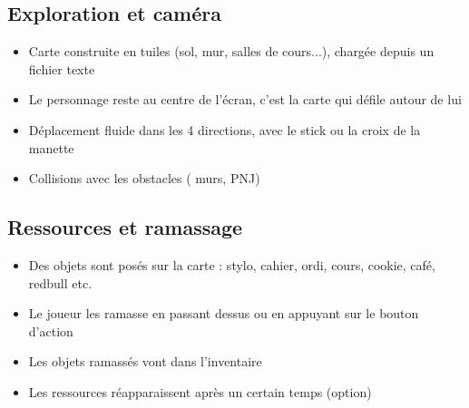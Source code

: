 \documentclass[11pt,a4paper]{article}
\begin{document}
\subsection{Exploration et caméra}
\begin{itemize}
    \item Carte construite en tuiles (sol, mur, salles de cours...), chargée depuis un fichier texte
    \item Le personnage reste au centre de l'écran, c'est la carte qui défile autour de lui
    \item Déplacement fluide dans les 4 directions, avec le stick ou la croix de la manette
    \item Collisions avec les obstacles ( murs, PNJ)
\end{itemize}

\subsection{Ressources et ramassage}
\begin{itemize}
    \item Des objets sont posés sur la carte : stylo, cahier, ordi, cours, cookie, café, redbull etc.
    \item Le joueur les ramasse en passant dessus ou en appuyant sur le bouton d'action
    \item Les objets ramassés vont dans l'inventaire
    \item Les ressources réapparaissent après un certain temps (option)
\end{itemize}
\end{document}
